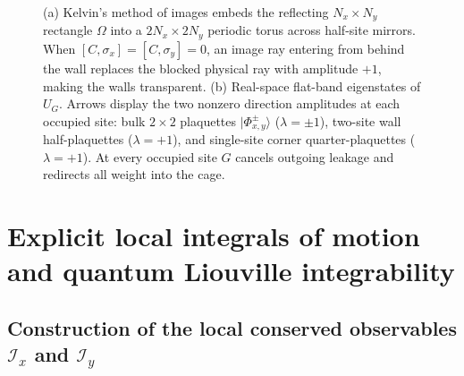 \documentclass[11pt,a4paper,oneside]{report}
\newcommand{\ket}[1]{\lvert #1\rangle}
\numberwithin{equation}{chapter}
\begin{document}
\begin{figure}[htbp]
\caption{(a) Kelvin's method of images embeds the reflecting \(N_x\times N_y\)
rectangle \(\Omega\) into a \(2N_x\times2N_y\) periodic torus across
half-site mirrors. When \([C,\sigma_x]=[C,\sigma_y]=0\), an image ray
entering from behind the wall replaces the blocked physical ray with
amplitude \(+1\), making the walls transparent.
(b) Real-space flat-band eigenstates of \(U_G\). Arrows display the
two nonzero direction amplitudes at each occupied site: bulk \(2\times2\)
plaquettes \(\ket{\Phi^\pm_{x,y}}\) (\(\lambda=\pm1\)), two-site wall
half-plaquettes (\(\lambda=+1\)), and single-site corner quarter-plaquettes
(\(\lambda=+1\)). At every occupied site \(G\) cancels outgoing leakage and
redirects all weight into the cage.}
\label{fig:groverunfolding}
\end{figure}

\section{Explicit local integrals of motion and quantum Liouville integrability}
\label{sec:localintegrals}

\subsection{Construction of the local conserved observables \(\mathcal I_x\) and \(\mathcal I_y\)}
\end{document}
